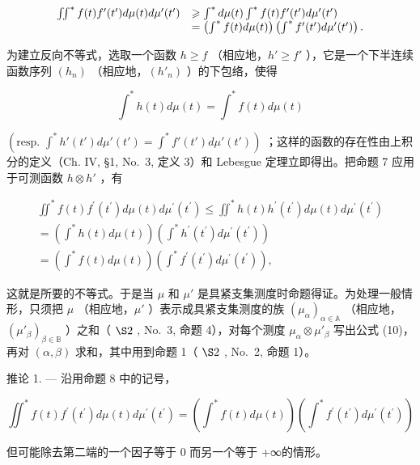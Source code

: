 \[
\begin{array}{r l} \iint^ {*} f (t) f ^ {\prime} (t ^ {\prime}) d \mu (t) d \mu^ {\prime} (t ^ {\prime}) & \geqslant \int^ {*} d \mu (t) \int^ {*} f (t) f ^ {\prime} (t ^ {\prime}) d \mu^ {\prime} (t ^ {\prime}) \\ & = \left(\int^ {*} f (t) d \mu (t)\right) \left(\int^ {*} f ^ {\prime} (t ^ {\prime}) d \mu^ {\prime} (t ^ {\prime})\right). \end{array}
\]

为建立反向不等式，选取一个函数 \(h \geqslant f\) （相应地，\(h' \geqslant f'\) ），它是一个下半连续函数序列 \((h_n)\) （相应地，\((h'_n)\) ）的下包络，使得

\[
\int^ {*} h (t) d \mu (t) = \int^ {*} f (t) d \mu (t)
\]

\((\text{resp. } \int^{*} h'(t') d\mu'(t') = \int^{*} f'(t') d\mu'(t'))\) ；这样的函数的存在性由上积分的定义（Ch. IV, §1, No.~3, 定义 3）和 Lebesgue 定理立即得出。把命题 7 应用于可测函数 \(h \otimes h'\) ，有

\[
\begin{array}{l} \iint^ {*} f (t) f ^ {\prime} (t ^ {\prime}) d \mu (t) d \mu^ {\prime} (t ^ {\prime}) \leqslant \iint^ {*} h (t) h ^ {\prime} (t ^ {\prime}) d \mu (t) d \mu^ {\prime} (t ^ {\prime}) \\ = \left(\int^ {*} h (t) d \mu (t)\right) \left(\int^ {*} h ^ {\prime} (t ^ {\prime}) d \mu^ {\prime} (t ^ {\prime})\right) \\ = \left(\int^ {*} f (t) d \mu (t)\right) \left(\int^ {*} f ^ {\prime} (t ^ {\prime}) d \mu^ {\prime} (t ^ {\prime})\right), \end{array}
\]

这就是所要的不等式。于是当 \(\mu\) 和 \(\mu'\) 是具紧支集测度时命题得证。为处理一般情形，只须把 \(\mu\) （相应地，\(\mu'\) ）表示成具紧支集测度的族 \((\mu_{\alpha})_{\alpha\in\mathbb{A}}\) （相应地，\((\mu'_{\beta})_{\beta\in\mathbb{B}}\) ）之和（ \(\S2\) , No.~3, 命题 4），对每个测度 \(\mu_{\alpha}\otimes\mu'_{\beta}\) 写出公式 (10)，再对 \((\alpha,\beta)\) 求和，其中用到命题 1（ \(\S2\) , No.~2, 命题 1）。

推论 1. --- 沿用命题 8 中的记号，

\[
\iint^ {*} f (t) f ^ {\prime} \left(t ^ {\prime}\right) d \mu (t) d \mu^ {\prime} \left(t ^ {\prime}\right) = \left(\int^ {*} f (t) d \mu (t)\right) \left(\int^ {*} f ^ {\prime} \left(t ^ {\prime}\right) d \mu^ {\prime} \left(t ^ {\prime}\right)\right)\tag{11}
\]

但可能除去第二端的一个因子等于 0 而另一个等于 +∞的情形。

